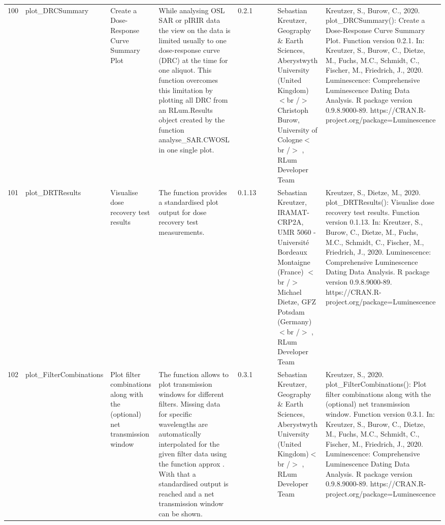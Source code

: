 \begin{table}[ht]
\begin{tabular}{rllllllll}
 \\ 
  100 & plot\_DRCSummary & Create a Dose-Response Curve Summary Plot & While analysing OSL SAR or pIRIR data the view on the data is limited usually to one dose-response curve (DRC) at the time for one aliquot. This function overcomes this limitation by plotting all DRC from an  RLum.Results  object created by the function  analyse\_SAR.CWOSL  in one single plot. & 0.2.1
 &  &  & Sebastian Kreutzer, Geography \& Earth Sciences, Aberystwyth University (United Kingdom)  $<$br /$>$ Christoph Burow, University of Cologne$<$br /$>$ , RLum Developer Team & Kreutzer, S., Burow, C., 2020. plot\_DRCSummary(): Create a Dose-Response Curve Summary Plot. Function version 0.2.1. In: Kreutzer, S., Burow, C., Dietze, M., Fuchs, M.C., Schmidt, C., Fischer, M., Friedrich, J., 2020. Luminescence: Comprehensive Luminescence Dating Data Analysis. R package version 0.9.8.9000-89. https://CRAN.R-project.org/package=Luminescence
 \\ 
  101 & plot\_DRTResults & Visualise dose recovery test results & The function provides a standardised plot output for dose recovery test measurements. & 0.1.13
 &  &  & Sebastian Kreutzer, IRAMAT-CRP2A, UMR 5060 - Université Bordeaux Montaigne (France) $<$br /$>$ Michael Dietze, GFZ Potsdam (Germany)$<$br /$>$ , RLum Developer Team & Kreutzer, S., Dietze, M., 2020. plot\_DRTResults(): Visualise dose recovery test results. Function version 0.1.13. In: Kreutzer, S., Burow, C., Dietze, M., Fuchs, M.C., Schmidt, C., Fischer, M., Friedrich, J., 2020. Luminescence: Comprehensive Luminescence Dating Data Analysis. R package version 0.9.8.9000-89. https://CRAN.R-project.org/package=Luminescence
 \\ 
  102 & plot\_FilterCombinations & Plot filter combinations along with the (optional) net transmission window & The function allows to plot transmission windows for different filters. Missing data for specific wavelengths are automatically interpolated for the given filter data using the function  approx . With that a standardised output is reached and a net transmission window can be shown. & 0.3.1
 &  &  & Sebastian Kreutzer, Geography \& Earth Sciences, Aberystwyth University (United Kingdom)$<$br /$>$ , RLum Developer Team & Kreutzer, S., 2020. plot\_FilterCombinations(): Plot filter combinations along with the (optional) net transmission window. Function version 0.3.1. In: Kreutzer, S., Burow, C., Dietze, M., Fuchs, M.C., Schmidt, C., Fischer, M., Friedrich, J., 2020. Luminescence: Comprehensive Luminescence Dating Data Analysis. R package version 0.9.8.9000-89. https://CRAN.R-project.org/package=Luminescence

\end{tabular}
\end{table}
